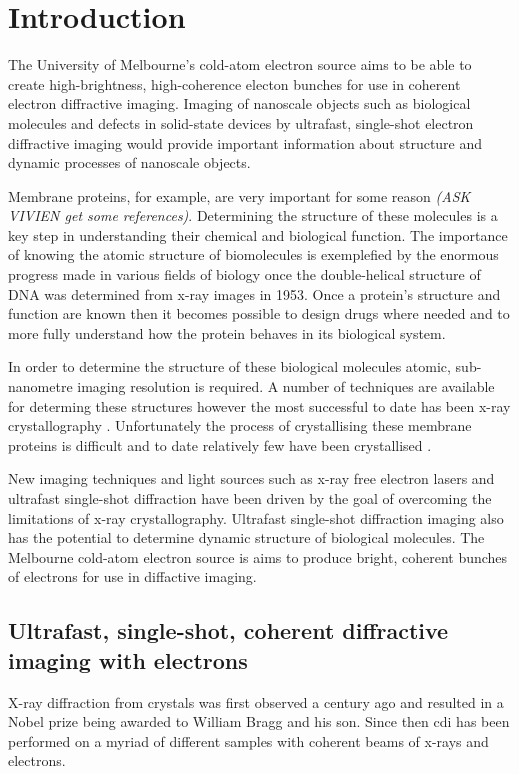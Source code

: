 \section{Introduction}

The University of Melbourne's cold-atom electron source aims to be able to create high-brightness, high-coherence electon bunches for use in coherent electron diffractive imaging. Imaging of nanoscale objects such as biological molecules\cite{dwyer_femtosecond_2006, williamson_clocking_1997} and defects in solid-state devices\cite{siwick_atomic-level_2003} by ultrafast, single-shot electron diffractive imaging would provide important information about structure and dynamic processes of nanoscale objects.

Membrane proteins, for example, are very important for some reason \emph{(ASK VIVIEN get some references)}. Determining the structure of these molecules is a key step in understanding their chemical and biological function. The importance of knowing the atomic structure of biomolecules is exemplefied by the enormous progress made in various fields of biology once the double-helical structure of DNA was determined from x-ray images in 1953\cite{watson_molecular_1953}. Once a protein's structure and function are known then it becomes possible to design drugs\cite{pinto_influenza_1992} where needed and to more fully understand how the protein behaves in its biological system.

In order to determine the structure of these biological molecules atomic, sub-nanometre imaging resolution is required. A number of techniques are available for determing these structures \cite{nettleship_methods_2008, svergun_small-angle_2003, opella_structure_2004} however the most successful to date has been x-ray crystallography \cite{kendrew_three-dimensional_1958, uson_advances_1999}. Unfortunately the process of crystallising these membrane proteins is difficult and to date relatively few have been crystallised \cite{geerlof_impact_2006}.

New imaging techniques and light sources such as x-ray free electron lasers and  ultrafast single-shot diffraction have been driven by the goal of overcoming the limitations of x-ray crystallography. Ultrafast single-shot diffraction imaging also has the potential to determine dynamic structure of biological molecules. The Melbourne cold-atom electron source is aims to produce bright, coherent bunches of electrons for use in diffactive imaging.

\subsection{Ultrafast, single-shot, coherent diffractive imaging with electrons}
X-ray diffraction from crystals was first observed a century ago\cite{bragg_x-rays_1912} and resulted in a Nobel prize being awarded to William Bragg and his son. Since then \gls{cdi} has been performed on a myriad of different samples with coherent beams of x-rays and electrons.

